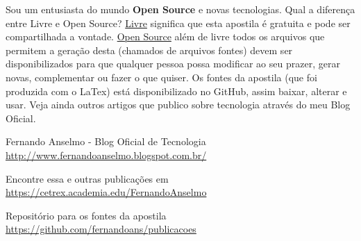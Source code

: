\documentclass[a4paper,11pt]{article}
\begin{document}
	












Sou um entusiasta do mundo \textbf{Open Source} e novas tecnologias. Qual a diferença entre Livre e Open Source? \underline{Livre} significa que esta apostila é gratuita e pode ser compartilhada a vontade. \underline{Open Source} além de livre todos os arquivos que permitem a geração desta (chamados de arquivos fontes) devem ser disponibilizados para que qualquer pessoa possa modificar ao seu prazer, gerar novas, complementar ou fazer o que quiser. Os fontes da apostila (que foi produzida com o LaTex) está disponibilizado no GitHub\cite{fernandoanselmo}, assim baixar, alterar e usar. Veja ainda outros artigos que publico sobre tecnologia através do meu Blog Oficial\cite{fernandoanselmo}.

\begin{thebibliography}{3}
  Fernando Anselmo - Blog Oficial de Tecnologia \\
  \url{http://www.fernandoanselmo.blogspot.com.br/}

  Encontre essa e outras publicações em \\
  \url{https://cetrex.academia.edu/FernandoAnselmo}

  Repositório para os fontes da apostila \\
  \url{https://github.com/fernandoans/publicacoes}
\end{thebibliography}
  
\end{document}
